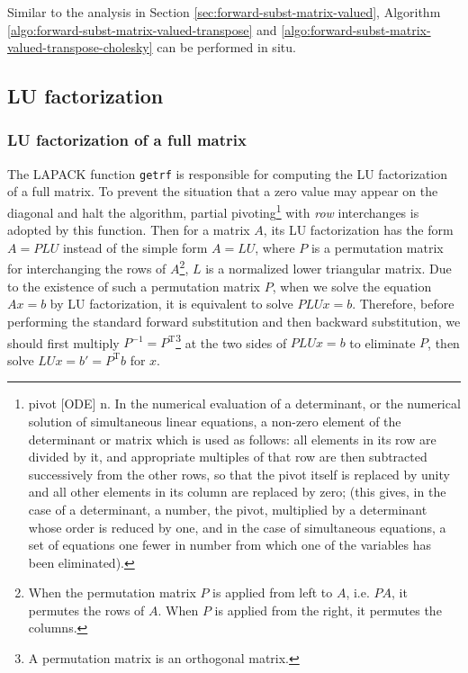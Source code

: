 \documentclass[11pt, a4paper]{book}
\begin{document}
Similar to the analysis in Section \ref{sec:forward-subst-matrix-valued}, Algorithm
\ref{algo:forward-subst-matrix-valued-transpose} and
\ref{algo:forward-subst-matrix-valued-transpose-cholesky} can be performed in situ.

\subsection{LU factorization}

\subsubsection{LU factorization of a full matrix}
\label{sec:lu-full}

The LAPACK function \texttt{getrf} is responsible for computing the LU factorization of a
full matrix. To prevent the situation that a zero value may appear on the diagonal and
halt the algorithm, partial pivoting\footnote{pivot [ODE] n. In the numerical evaluation
  of a determinant, or the numerical solution of simultaneous linear equations, a non-zero
  element of the determinant or matrix which is used as follows: all elements in its row
  are divided by it, and appropriate multiples of that row are then subtracted
  successively from the other rows, so that the pivot itself is replaced by unity and all
  other elements in its column are replaced by zero; (this gives, in the case of a
  determinant, a number, the pivot, multiplied by a determinant whose order is reduced by
  one, and in the case of simultaneous equations, a set of equations one fewer in number
  from which one of the variables has been eliminated).} with \emph{row} interchanges is
adopted by this function. Then for a matrix $A$, its LU factorization has the form
$A=P L U$ instead of the simple form $A = LU$, where $P$ is a permutation matrix for
interchanging the rows of $A$\footnote{When the permutation matrix $P$ is applied from
  left to $A$, i.e. $PA$, it permutes the rows of $A$. When $P$ is applied from the right,
  it permutes the columns.}, $L$ is a normalized lower triangular matrix. Due to the
existence of such a permutation matrix $P$, when we solve the equation $Ax = b$ by LU
factorization, it is equivalent to solve $PLU x = b$. Therefore, before performing the
standard forward substitution and then backward substitution, we should first multiply
$P^{-1} = P^{\mathrm{T}}$\footnote{A permutation matrix is an orthogonal matrix.} at the
two sides of $PLU x = b$ to eliminate $P$, then solve $LU x = b' = P^{\mathrm{T}}b$ for
$x$.
\end{document}
